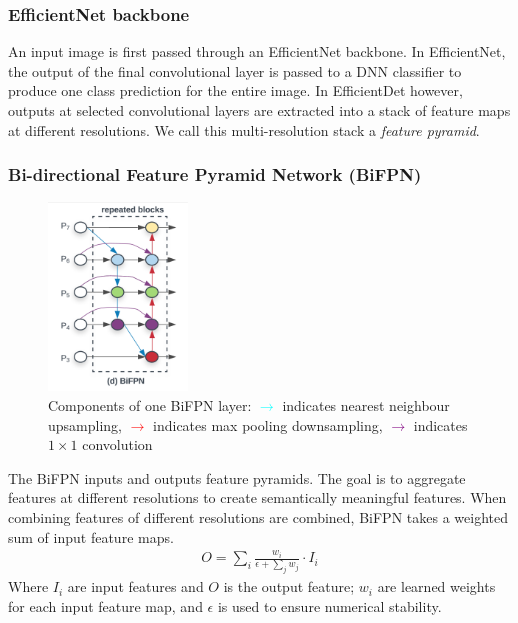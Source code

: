 \documentclass[12pt,a4paper,twoside,openright]{report}
\begin{document}
\subsubsection{EfficientNet backbone}
An input image is first passed through an EfficientNet \cite{tan_efficientnet_2020} backbone. In EfficientNet, the output of the final convolutional layer is passed to a DNN classifier to produce one class prediction for the entire image. In EfficientDet however, outputs at selected convolutional layers are extracted into a stack of feature maps at different resolutions. We call this multi-resolution stack a \textit{feature pyramid}. 

\subsubsection{Bi-directional Feature Pyramid Network (BiFPN)}
\begin{figure}[h]
    \centering
    \includegraphics[height=5cm]{figs/implementation/bifpn.png}
    \caption{Components of one BiFPN layer: \textcolor{cyan}{$\rightarrow$} indicates nearest neighbour upsampling, \textcolor{red}{$\rightarrow$} indicates max pooling downsampling, \textcolor{purple}{$\rightarrow$} indicates $1\times 1$ convolution}
    \label{fig:bifpn}
\end{figure}

The BiFPN inputs and outputs feature pyramids. The goal is to aggregate features at different resolutions to create semantically meaningful features. When combining features of different resolutions are combined, BiFPN takes a weighted sum of input feature maps.
\begin{align}
    O=\sum_i \frac{w_i}{\epsilon + \sum_j w_j}\cdot I_i
\end{align}
Where $I_i$ are input features and $O$ is the output feature; $w_i$ are learned weights for each input feature map, and $\epsilon$ is used to ensure numerical stability.
\end{document}

